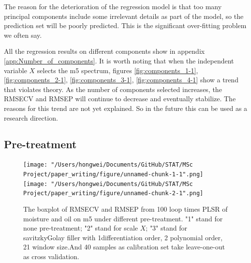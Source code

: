 \documentclass[a4paper,12pt,titlepage]{article} %
\numberwithin{equation}{section}  %
\begin{document}
	The reason for the deterioration of the regression model is that too many principal components include some irrelevant details as part of the model, so the prediction set will be poorly predicted. This is the significant over-fitting problem we often say.
	
	All the regression results on different components show in appendix \ref{app:Number_of_components}.
	It is worth noting that when the independent variable $X$ selects the m5 spectrum, figures \ref{fig:components_1-1}, \ref{fig:components_2-1}, \ref{fig:components_3-1}, \ref{fig:components_4-1} show a trend that violates theory. As the number of components selected increases, the RMSECV and RMSEP  will continue to decrease and eventually stabilize. The reasons for this trend are not yet explained. So in the future this can be used as a research direction.
	
	\subsection{Pre-treatment}
	\label{sec:Pre-treatment}
	
				\begin{figure}[h]    %
		\centering           %
		\texttt{[image: "/Users/hongwei/Documents/GitHub/STAT/MSc Project/paper\_writing/figure/unnamed-chunk-1-1".png]}  %
		\texttt{[image: "/Users/hongwei/Documents/GitHub/STAT/MSc Project/paper\_writing/figure/unnamed-chunk-2-1".png]}  %
		\caption{The boxplot of RMSECV and RMSEP from 100 loop times PLSR of moisture and oil on m5 under different pre-treatment. "1" stand for none pre-treatment; "2" stand for scale $X$; "3" stand for savitzkyGolay filler with 1differentiation order, 2 polynomial order, 21 window size.And 40 samples as calibration set take leave-one-out as cross validation.}          %
		\label{fig:pretreatment-1}               %
	\end{figure}                        %
	
\end{document}
